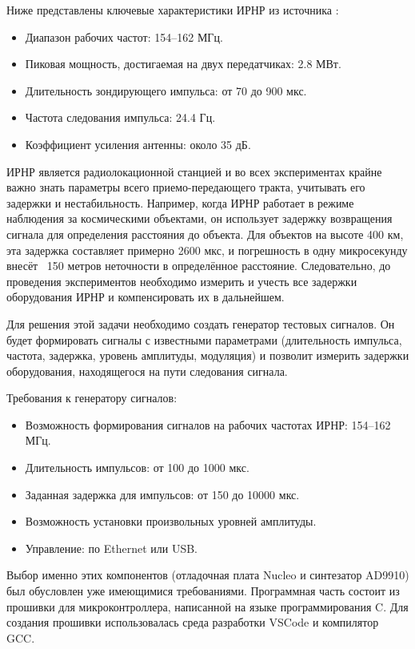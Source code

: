 \documentclass[rusmathsym, eqnumwithinsec, amspack, hyperref]{bomgost}
\begin{document}
Ниже представлены ключевые характеристики ИРНР из источника \cite{Kushnarev}:

\begin{itemize}
	\item Диапазон рабочих частот: 154–162 МГц.
	\item Пиковая мощность, достигаемая на двух передатчиках: 2.8 МВт.
	\item Длительность зондирующего импульса: от 70 до 900 мкс.
	\item Частота следования импульса: 24.4 Гц.
	\item Коэффициент усиления антенны: около 35 дБ.
\end{itemize}

ИРНР является радиолокационной станцией и во всех экспериментах крайне важно знать параметры всего приемо-передающего тракта, учитывать его задержки и нестабильность. Например, когда ИРНР работает в режиме наблюдения за космическими объектами, он использует задержку возвращения сигнала для определения расстояния до объекта. Для объектов на высоте 400 км, эта задержка составляет примерно 2600 мкс, и погрешность в одну микросекунду внесёт ~150 метров неточности в определённое расстояние. Следовательно, до проведения экспериментов необходимо измерить и учесть все задержки оборудования ИРНР и компенсировать их в дальнейшем.

Для решения этой задачи необходимо создать генератор тестовых сигналов. Он будет формировать сигналы с известными параметрами (длительность импульса, частота, задержка, уровень амплитуды, модуляция) и позволит измерить задержки оборудования, находящегося на пути следования сигнала.

Требования к генератору сигналов:

\begin{itemize}
	\item Возможность формирования сигналов на рабочих частотах ИРНР: 154–162 МГц.
	\item Длительность импульсов: от 100 до 1000 мкс.
	\item Заданная задержка для импульсов: от 150 до 10000 мкс.
	\item Возможность установки произвольных уровней амплитуды.
	\item Управление: по Ethernet или USB.
\end{itemize}

Выбор именно этих компонентов (отладочная плата Nucleo и синтезатор AD9910) был обусловлен уже имеющимися требованиями. Программная часть состоит из прошивки для микроконтроллера, написанной на языке программирования C. Для создания прошивки использовалась среда разработки VSCode и компилятор GCC.
\end{document}

